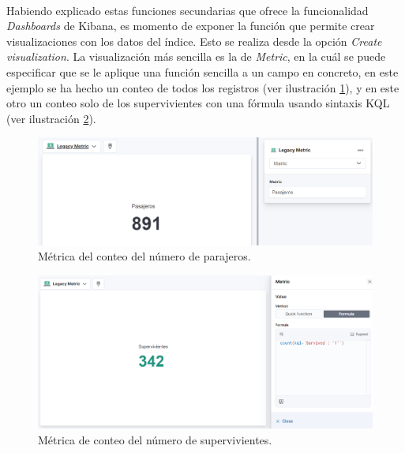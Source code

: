 \paragraph{}
\paragraph{}


Habiendo explicado estas funciones secundarias que ofrece la funcionalidad \textit{Dashboards} de Kibana, es momento de exponer la función que permite crear visualizaciones con los datos del índice. Esto se realiza desde la opción \textit{Create visualization}. La visualización más sencilla es la de \textit{Metric}, en la cuál se puede especificar que se le aplique una función sencilla a un campo en concreto, en este ejemplo se ha hecho un conteo de todos los registros (ver ilustración  \ref{fig:kibana12}), y en este otro un conteo solo de los supervivientes con una fórmula usando sintaxis KQL (ver ilustración  \ref{fig:kibana13}).

\begin{figure}
    \centering
    \includegraphics[width=1\linewidth]{img/kibana12.png}
    \caption{Métrica del conteo del número de parajeros.}
    \label{fig:kibana12}
\end{figure}
\begin{figure}
    \centering
    \includegraphics[width=1\linewidth]{img/kibana13.png}
    \caption{Métrica de conteo del número de supervivientes.}
    \label{fig:kibana13}
\end{figure}

